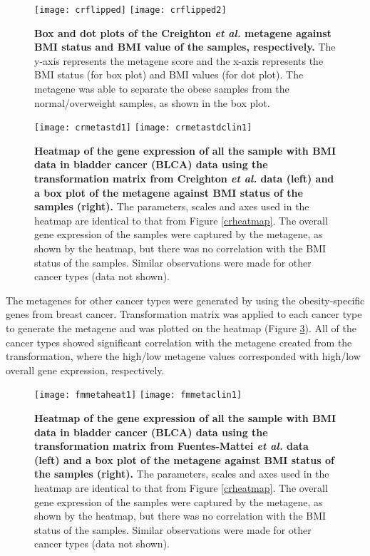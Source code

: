 \documentclass[12pt, a4paper]{article}
\begin{document}
\begin{figure}[h!]
\centering
\texttt{[image: crflipped]}
\texttt{[image: crflipped2]}
\caption{\textbf{Box and dot plots of the Creighton \textit{et al.} metagene against BMI status and BMI value of the samples, respectively.}
The y-axis represents the metagene score and the x-axis represents the BMI status (for box plot) and BMI values (for dot plot).
The metagene was able to separate the obese samples from the normal/overweight samples, as shown in the box plot.
}
\label{crmetavsbmi}
\end{figure}

\begin{figure}[h!]
\centering
\texttt{[image: crmetastd1]}
\texttt{[image: crmetastdclin1]}
\caption{\textbf{Heatmap of the gene expression of all the sample with BMI data in bladder cancer (BLCA) data using the transformation matrix from Creighton \textit{et al.} data  (left) and a box plot of the metagene against BMI status of the samples (right).}
The parameters, scales and axes used in the heatmap are identical to that from Figure \ref{crheatmap}.
The overall gene expression of the samples were captured by the metagene, as shown by the heatmap, but there was no correlation with the BMI status of the samples.
Similar observations were made for other cancer types (data not shown).
}
\label{blcameta}
\end{figure}

The metagenes for other cancer types were generated by using the obesity-specific genes from breast cancer.
Transformation matrix was applied to each cancer type to generate the metagene and was plotted on the heatmap (Figure \ref{blcameta}).
All of the cancer types showed significant correlation with the metagene created from the transformation, where the high/low metagene values corresponded with high/low overall gene expression, respectively.

\begin{figure}[h!]
\centering
\texttt{[image: fmmetaheat1]}
\texttt{[image: fmmetaclin1]}
\caption{\textbf{Heatmap of the gene expression of all the sample with BMI data in bladder cancer (BLCA) data using the transformation matrix from Fuentes-Mattei \textit{et al.} data  (left) and a box plot of the metagene against BMI status of the samples (right).}
The parameters, scales and axes used in the heatmap are identical to that from Figure \ref{crheatmap}.
The overall gene expression of the samples were captured by the metagene, as shown by the heatmap, but there was no correlation with the BMI status of the samples.
Similar observations were made for other cancer types (data not shown).
}
\label{blcameta}
\end{figure}
\end{document}

